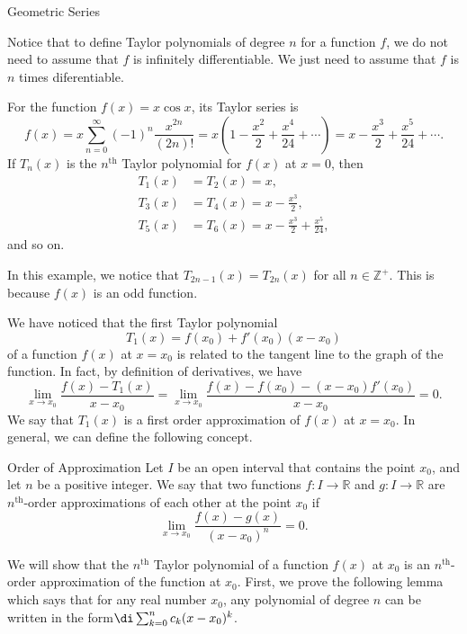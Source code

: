 \begin{example}[label=230305_16]{Geometric Series}
\begin{example}[label=230304_9]{}
\begin{example}{}
 Notice that to define Taylor polynomials of degree $n$ for a function $f$, we do not need to assume that $f$ is infinitely differentiable. We just need to assume that $f$ is $n$ times diferentiable. 

\begin{example}
{} For the function $f(x)=x\cos x$, its Taylor series is 
\[f(x)=x\sum_{n=0}^{\infty}(-1)^n\frac{x^{2n}}{(2n)!}=x\left(1-\frac{x^2}{2}+\frac{x^4}{24}+\cdots\right)=x-\frac{x^3}{2}+\frac{x^5}{24}+\cdots.\]
If $T_n(x)$ is the $n^{\text{th}}$ Taylor polynomial for $f(x)$ at $x=0$, then
\begin{align*}T_1(x) &=T_2(x)=x,\\
T_3(x) &=T_4(x)=x-\frac{x^3}{2},\\
T_5(x)&=T_6(x)=x-\frac{x^3}{2}+\frac{x^5}{24},
\end{align*}and so on.
\end{example}
In this example, we notice that $T_{2n-1}(x)=T_{2n}(x)$ for all $n\in\mathbb{Z}^+$.  This is because   $f(x)$ is an odd function.


We have noticed that the first Taylor polynomial \[T_1(x)=f(x_0)+f'(x_0)(x-x_0)\] of a function $f(x)$ at $x=x_0$ is related to the tangent line to the graph of the function. 
In fact, by definition of derivatives, we have
\[\lim_{x\to x_0}\frac{f(x)-T_1(x)}{x-x_0}=\lim_{x\to x_0}\frac{f(x)-f(x_0)-(x-x_0)f'(x_0)}{x-x_0}=0.\]We say that $T_1(x)$ is a first order approximation of $f(x)$ at $x=x_0$. 
In general, we can define the following concept.
\begin{definition}{Order of Approximation}
Let $I$ be an open interval that contains the point $x_0$, and let $n$ be a positive integer. We say that two functions $f:I\to\mathbb{R}$ and $g: I\to\mathbb{R}$ are $n^{\text{th}}$-order approximations of each other at the point $x_0$ if
\[\lim_{x\to x_0}\frac{f(x)-g(x)}{(x-x_0)^n}=0.\]
\end{definition}
We will show that the $n^{\text{th}}$ Taylor polynomial of a function $f(x)$ at $x_0$ is an $n^{\text{th}}$-order approximation of the function at $x_0$. First, we prove 
the following lemma which says that for any real number $x_0$, any polynomial of degree $n$ can be written in the form$\di\sum_{k=0}^n c_k(x-x_0)^k$. 


\end{example}
\end{example}
\end{example}
